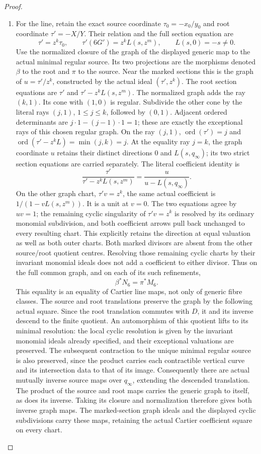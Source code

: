 \begin{proof}
\begin{enumerate}[label=\arabic*.]
\item For the line, retain the exact source coordinate
\(\tau_0=-x_0/y_0\) and root coordinate \(\tau'=-X/Y\).
Their relation and the full section equation are
\[
 \tau'=z^k\tau_0,\qquad
 \tau'(6G')=z^k L(s,z^m),\qquad L(s,0)=-s\ne0.
 \tag{EX.10}
\]
Use the normalized closure of the graph of the displayed generic
map to the actual minimal regular source. Its two projections
are the morphisms denoted \(\beta\) to the root and \(\pi\)
to the source. Near the marked sections this is the graph of
\(u=\tau'/z^k\), constructed by the actual ideal
\((\tau',z^k)\). The root section equations are
\(\tau'\) and \(\tau'-z^kL(s,z^m)\). The normalized graph adds the ray \((k,1)\). Its cone with
\((1,0)\) is regular. Subdivide the other cone by the literal
rays \((j,1)\), \(1\le j\le k\), followed by \((0,1)\).
Adjacent ordered determinants are
\(j\cdot1-(j-1)\cdot1=1\); these are exactly the exceptional
rays of this chosen regular graph. On the ray \((j,1)\),
\(\operatorname{ord}(\tau')=j\) and
\(\operatorname{ord}(\tau'-z^kL)=\min(j,k)=j\).
At the equality ray \(j=k\),
the graph coordinate \(u\) retains their distinct directions
\(0\) and \(L(s,q_\infty)\); its two strict section equations
are carried separately. The literal coefficient identity is
\[
 \frac{\tau'}{\tau'-z^kL(s,z^m)}
       =\frac{u}{u-L(s,q_\infty)}.
 \tag{EX.11}
\]
On the other graph chart, \(\tau'v=z^k\), the same actual
coefficient is \(1/(1-vL(s,z^m))\). It is a unit at \(v=0\).
The two equations agree by \(uv=1\); the remaining cyclic
singularity of \(\tau'v=z^k\) is resolved by its ordinary
monomial subdivision, and both coefficient arrows pull back
unchanged to every resulting chart. This explicitly retains
the direction at equal valuation as well as both outer charts.
Both marked divisors are absent from the other source/root
quotient centres. Resolving those remaining cyclic charts by
their invariant monomial ideals does not add a coefficient to
either divisor. Thus on the full common graph, and on each of
its such refinements,
\[
                \beta^*N_6=\pi^*M_6.
 \tag{EX.12}
\]
This equality is an equality of Cartier line maps, not only of
generic fibre classes. The source and root translations preserve the graph by the
following actual square. Since the root translation commutes with
\(D\), it and its inverse descend to the finite quotient. An automorphism
of this quotient lifts to its minimal resolution: the local cyclic
resolution is given by the invariant monomial ideals already
specified, and their exceptional valuations are preserved. The
subsequent contraction to the unique minimal regular source is
also preserved, since the product carries each contractible
vertical curve and its intersection data to that of its image.
Consequently there are actual mutually inverse source maps over
\(q_\infty\), extending the descended translation. The product of the
source and root maps carries the generic graph to itself, as does
its inverse. Taking its closure and normalization therefore gives
both inverse graph maps. The marked-section graph ideals and the
displayed cyclic subdivisions carry these maps, retaining the
actual Cartier coefficient square on every chart.


\end{enumerate}
\end{proof}

